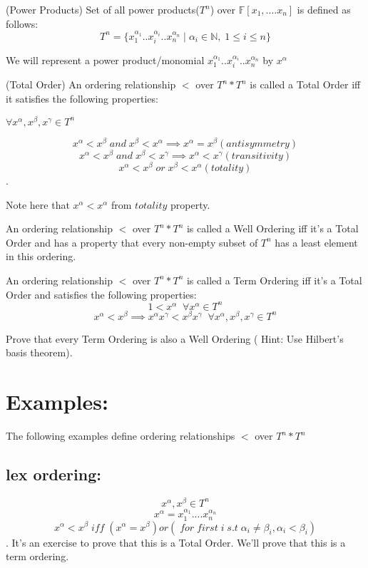 \begin{definition}(Power Products)
Set of all power products($T^n$) over $\mathbb{F}[x_1,....x_n]$ is defined as follows:
$$T^n=\{x_{1}^{\alpha_{1}}..x_{i}^{\alpha_{i}}..x_{n}^{\alpha_{n}}\;|\; \alpha_{i}\in \mathbb{N},\;1\leq i\leq n\}$$
\end{definition}
We will represent a power product/monomial $x_{1}^{\alpha_{1}}..x_{i}^{\alpha_{i}}..x_{n}^{\alpha_{n}}$ by $x^{\alpha}$ 
\begin{definition}(Total Order)
An ordering relationship $<$ over $T^n*T^n$ is called a Total Order iff it satisfies the following properties:

$ \forall x^{\alpha},x^{\beta},x^{\gamma} \in T^n$

$$ x^{\alpha} < x^{\beta}\; and \;x^{\beta} < x^{\alpha} \implies x^{\alpha} = x^{\beta} (antisymmetry)$$
$$ x^{\alpha} < x^{\beta} \;and\; x^{\beta} < x^{\gamma} \implies x^{\alpha} < x^{\gamma} (transitivity)$$
$$x^{\alpha} < x^{\beta} \;or\; x^{\beta} < x^{\alpha} (totality)$$.

Note here that $x^{\alpha} < x^{\alpha}$ from $totality$ property.
\end{definition}

\begin{definition} 
An ordering relationship $<$ over $T^n*T^n$ is called a Well Ordering iff it's a Total Order and has a property that every non-empty subset of $T^n$ has a least element in this ordering.
\end{definition}

\begin{definition} \label{def:term-order}
An ordering relationship $<$ over $T^n*T^n$ is called a Term Ordering iff it's a Total Order and satisfies the following properties:
$$1<x^{\alpha}\;\; \forall x^{\alpha}\in T^n$$
$$x^{\alpha}<x^{\beta}\implies x^{\alpha}x^{\gamma}<x^{\beta}x^{\gamma}\;\;\forall x^{\alpha},x^{\beta},x^{\gamma}\in T^n$$
\end{definition}

\begin{exercise}
Prove that every Term Ordering is also a Well Ordering ( Hint: Use Hilbert's basis theorem).
\end{exercise}
\section*{Examples:}
The following examples define ordering relationships $<$ over $T^{n}*T^{n}$
\subsection*{lex ordering:}
$$x^{\alpha},x^{\beta} \in T^{n}$$
$$x^{\alpha}=x_{1}^{\alpha_{1}}....x_{n}^{\alpha_{n}}$$
$$x^{\alpha}<x^{\beta}\; iff \;(x^{\alpha}=x^{\beta}) or ( \;for \;first \;i \;s.t\; \alpha_{i}\neq \beta_{i} , \alpha_{i}<\beta_{i})$$.
It's an exercise to prove that this is a Total Order. We'll prove that this is a term ordering.

